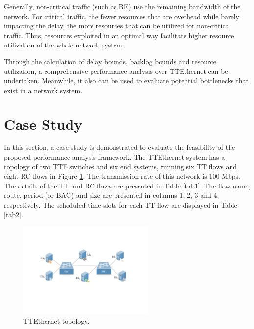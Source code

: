 \documentclass[electronics,article,accept,moreauthors,pdftex]{Definitions/mdpi}
\begin{document}
{Generally, non-critical traffic (such as BE) use the remaining bandwidth of the network. For critical traffic, the fewer resources that are overhead while barely impacting the delay, the more resources that can be utilized for non-critical traffic. Thus, resources exploited in an optimal way facilitate higher resource utilization of the whole network system.}

Through the calculation of delay bounds, backlog bounds and resource utilization, a comprehensive performance analysis {over} TTEthernet can be undertaken. Meanwhile, it also can be used to {evaluate} potential bottlenecks that exist in a {network system}.

\section{Case Study}
\label{case}

In this section, a case study is demonstrated to evaluate the feasibility of the proposed performance analysis framework. The TTEthernet system has a topology of two TTE switches and six end systems, running six TT flows and eight RC flows in {Figure} \ref{ach}. The transmission rate of this network is 100 Mbps. The details of the TT and RC flows are presented in Table \ref{tab1}. The flow name, route, period (or BAG) and size are presented in columns 1, 2, 3 and 4, respectively. The scheduled time slots for each TT flow are displayed in Table \ref{tab2}.

\begin{figure}[H]
\centering
\includegraphics[width=0.6\textwidth]{figures/archi}
\caption{TTEthernet topology.}
\label{ach}
\end{figure}
\unskip
\end{document}
